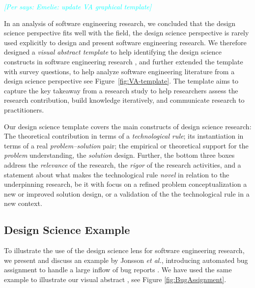 \documentclass[graybox]{svmult}
\newcommand{\per}[1]{\textcolor{cyan}{{\it [Per says: #1]}}}
\newcommand{\per}[1]{}
\begin{document}
\per{Emelie: update VA graphical template}

In an analysis of software engineering research, we concluded that the design science perspective fits well with the field, the design science perspective is rarely used explicitly to design and present software engineering research. We therefore designed a \emph{visual abstract template} to help identifying the design science constructs in software engineering research \cite{StoreyESEM17}, and further extended the template with survey questions, to help analyze software engineering literature from a design science perspective \cite{Engstrom19arxiv} see Figure~\ref{fig:VA-template}. The template aims to capture the key takeaway from a research study to help researchers assess the research contribution, build knowledge iteratively, and communicate research to practitioners. %

Our design science template covers the main constructs of design science research: The theoretical contribution in terms of a \emph{technological rule}; its instantiation in terms of a real \emph{problem--solution} pair;  the empirical or theoretical support for the \emph{problem} understanding, the \emph{solution} design. Further, the bottom three boxes address the \emph{relevance} of the research, the \emph{rigor} of the research activities,  and a statement about what makes the technological rule \emph{novel} in relation to the underpinning research, be it with focus on a refined problem conceptualization a new or improved solution design, or a validation of the the technological rule in a new context. 




\subsection{Design Science Example}
\label{sec:examples}
To illustrate the use of the design science lens for software engineering research, we present and discuss an example by Jonsson \emph{et al.}, introducing automated bug assignment to handle a large inflow of bug reports \cite{JonssonBug15}. We have used the same example to illustrate our visual abstract \cite{StoreyESEM17}, see Figure \ref{fig:BugAssignment}.
\end{document}
